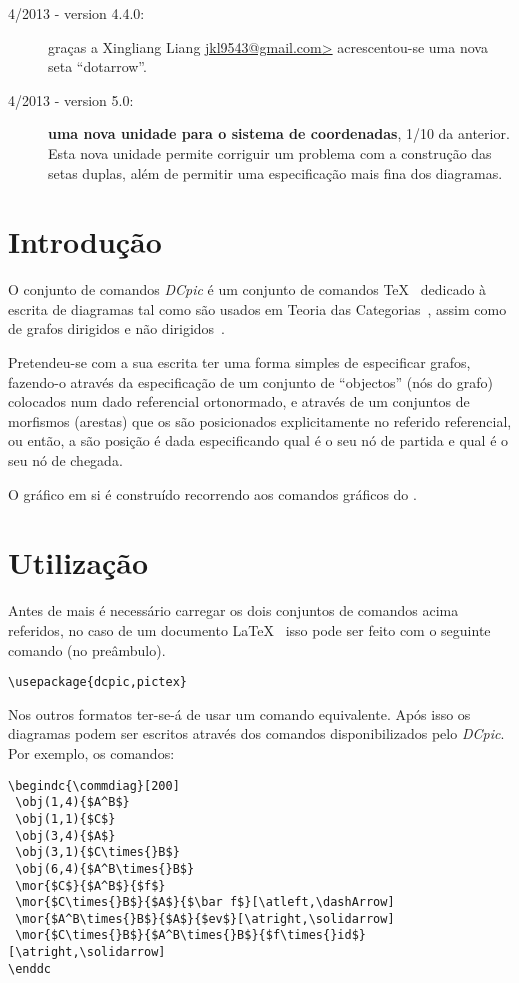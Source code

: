 \documentclass[a4paper,11pt]{article}
\begin{document}
\begin{description}
\item[4/2013 - version 4.4.0:] graças a Xingliang Liang
  \url{jkl9543@gmail.com>} acrescentou-se uma nova seta ``dotarrow''.

\item[4/2013 - version 5.0:] {\bf uma nova unidade para o sistema de
    coordenadas}, 1/10 da anterior. Esta nova unidade permite
  corriguir um problema com a construção das setas duplas, além de
  permitir uma especificação mais fina dos diagramas.
\end{description}

\section{Introdução} 

O conjunto de comandos {\em DCpic} é um conjunto de comandos
\TeX~\cite{Knuth86} dedicado à escrita de diagramas tal como são
usados em Teoria das Categorias~\cite{Herrlich73,Pierce98}, assim como
de grafos dirigidos e não dirigidos~\cite{Harary72}.

Pretendeu-se com a sua escrita ter uma forma simples de especificar
grafos, fazendo-o através da especificação de um conjunto de
``objectos'' (nós do grafo) colocados num dado referencial
ortonormado, e através de um conjuntos de morfismos (arestas) que os
são posicionados explicitamente no referido referencial, ou então,
a são posição é dada especificando qual é o seu nó de
partida e qual é o seu nó de chegada.

O gráfico em si é construído recorrendo aos comandos gráficos
do \PiCTeX.

\section{Utilização}

Antes de mais é necessário carregar os dois conjuntos de comandos
acima referidos, no caso de um documento \LaTeX~\cite{Lamport94} isso
pode ser feito com o seguinte comando (no preâmbulo).

\begin{verbatim}
\usepackage{dcpic,pictex}
\end{verbatim}

Nos outros formatos ter-se-á de usar um comando equivalente. Após
isso os diagramas podem ser escritos através dos comandos
disponibilizados pelo {\em DCpic}.  Por exemplo, os comandos:


\begin{lstlisting}
\begindc{\commdiag}[200]
 \obj(1,4){$A^B$}
 \obj(1,1){$C$}
 \obj(3,4){$A$}
 \obj(3,1){$C\times{}B$}
 \obj(6,4){$A^B\times{}B$}
 \mor{$C$}{$A^B$}{$f$}
 \mor{$C\times{}B$}{$A$}{$\bar f$}[\atleft,\dashArrow]
 \mor{$A^B\times{}B$}{$A$}{$ev$}[\atright,\solidarrow]
 \mor{$C\times{}B$}{$A^B\times{}B$}{$f\times{}id$}[\atright,\solidarrow]
\enddc
\end{lstlisting}
\end{document}
